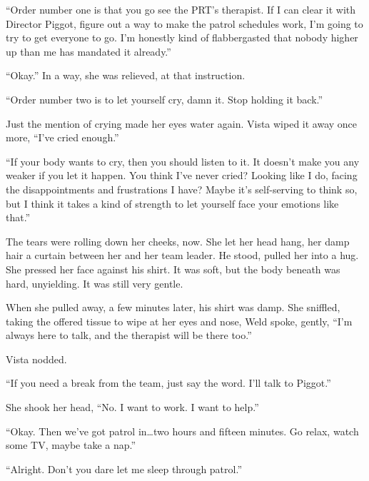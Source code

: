 ``Order number one is that you go see the PRT's therapist.  If I can clear it with Director Piggot, figure out a way to make the patrol schedules work, I'm going to try to get everyone to go.  I'm honestly kind of flabbergasted that nobody higher up than me has mandated it already.''



``Okay.''  In a way, she was relieved, at that instruction.



``Order number two is to let yourself cry, damn it.  Stop holding it back.''



Just the mention of crying made her eyes water again.  Vista wiped it away once more, ``I've cried enough.''



``If your body wants to cry, then you should listen to it.  It doesn't make you any weaker if you let it happen.  You think I've never cried?  Looking like I do, facing the disappointments and frustrations I have?  Maybe it's self-serving to think so, but I think it takes a kind of strength to let yourself face your emotions like that.''



The tears were rolling down her cheeks, now.  She let her head hang, her damp hair a curtain between her and her team leader.  He stood, pulled her into a hug.  She pressed her face against his shirt.  It was soft, but the body beneath was hard, unyielding.  It was still very gentle.



When she pulled away, a few minutes later, his shirt was damp.  She sniffled, taking the offered tissue to wipe at her eyes and nose, Weld spoke, gently, ``I'm always here to talk, and the therapist will be there too.''



Vista nodded.



``If you need a break from the team, just say the word.  I'll talk to Piggot.''



She shook her head, ``No.  I want to work.  I want to help.''



``Okay.  Then we've got patrol in\ldots two hours and fifteen minutes.  Go relax, watch some TV, maybe take a nap.''



``Alright.  Don't you dare let me sleep through patrol.''



